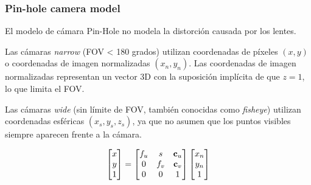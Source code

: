 \begin{frame}
    \frametitle{Pin-hole camera model}
    
    El modelo de cámara Pin-Hole no modela la distorción causada por los lentes.

    Las cámaras \emph{narrow} (FOV < 180 grados) utilizan coordenadas de píxeles $(x, y)$ o coordenadas de imagen normalizadas $(x_{n}, y_{n})$. 
    Las coordenadas de imagen normalizadas representan un vector 3D con la suposición implícita de que $z = 1$, lo que limita el FOV.

    Las cámaras \emph{wide} (sin límite de FOV, también conocidas como \emph{fisheye}) utilizan coordenadas esféricas $(x_{s}, y_{s}, z_{s})$, ya que no asumen que los puntos visibles siempre aparecen frente a la cámara.

    \begin{equation*}
        \begin{bmatrix}
            x\\
            y\\
            1
        \end{bmatrix} =
        \begin{bmatrix}
            f_{u} & s & \boldsymbol{\mathbf{c}}_{u}\\
            0 & f_{v} & \boldsymbol{\mathbf{c}}_{v}\\
            0 & 0 & 1
        \end{bmatrix}
        \begin{bmatrix}
            x_{n}\\
            y_{n}\\
            1
        \end{bmatrix}
    \end{equation*}
    
\end{frame}


